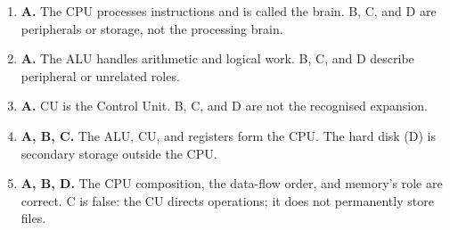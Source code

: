 \documentclass[11pt]{article}
\begin{document}
\begin{enumerate}[label=\textbf{Q\arabic*.}, leftmargin=*]
\item \textbf{A.} The CPU processes instructions and is called the brain. B, C, and D are peripherals or storage, not the processing brain.
\item \textbf{A.} The ALU handles arithmetic and logical work. B, C, and D describe peripheral or unrelated roles.
\item \textbf{A.} CU is the Control Unit. B, C, and D are not the recognised expansion.
\item \textbf{A, B, C.} The ALU, CU, and registers form the CPU. The hard disk (D) is secondary storage outside the CPU.
\item \textbf{A, B, D.} The CPU composition, the data-flow order, and memory's role are correct. C is false: the CU directs operations; it does not permanently store files.
\end{enumerate}
\def\JKSSBLessonID{4}\def\JKSSBAnswers{1}
\end{document}
